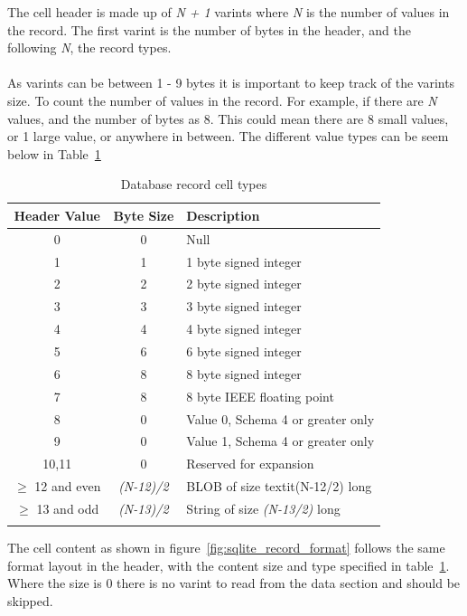 The cell header is made up of \textit{N + 1} varints where \textit{N} is the number of values in the record. The first varint is the number of bytes in the header, and the following \textit{N}, the record types.
\\\\
As varints can be between 1 - 9 bytes it is important to keep track of the varints size. To count the number of values in the record. For example, if there are \textit{N} values, and the number of bytes as 8. This could mean there are 8 small values, or 1 large value, or anywhere in between. The different value types can be seem below in Table~\ref{tbl:cell_header_record_types} 

\begin{longtable}[h]{| c | c| p{5cm} |}
		\hline
			\textbf{Header Value} & \textbf{Byte Size} & \textbf{Description} \\ 
		\hline
		\endhead
			0 & 0 & Null \\
		\hline
			1 & 1 & 1 byte signed integer \\
		\hline
			2 & 2 & 2 byte signed integer \\
		\hline
			3 & 3 & 3 byte signed integer \\
		\hline
			4 & 4 & 4 byte signed integer \\
		\hline
			5 & 6 & 6 byte signed integer \\
		\hline
			6 & 8 & 8 byte signed integer \\
		\hline
			7 & 8 & 8 byte IEEE floating point \\
		\hline
			8 & 0 & Value 0, Schema 4 or greater only \\
		\hline
			9 & 0 & Value 1, Schema 4 or greater only \\
		\hline
			10,11 & 0 & Reserved for expansion \\
		\hline
			$\geq$ 12 and even & \textit{(N-12)/2} & BLOB of size textit{(N-12/2)} long \\
		\hline
			$\geq$ 13 and odd & \textit{(N-13)/2} & String of size \textit{(N-13/2)} long \\
		\hline
	\caption{Database record cell types}
	\label{tbl:cell_header_record_types}
\end{longtable}

The cell content as shown in figure~\ref{fig:sqlite_record_format} follows the same format layout in the header, with the content size and type specified in table~\ref{tbl:cell_header_record_types}. Where the size is 0 there is no varint to read from the data section and should be skipped.


